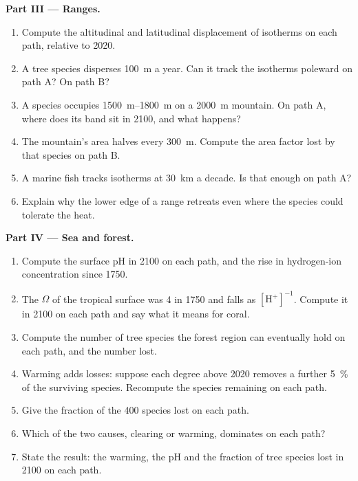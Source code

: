 \begin{problem}
\medskip
\noindent\textbf{Part III --- Ranges.}
\begin{enumerate}[resume]
  \item Compute the altitudinal and latitudinal displacement of
        isotherms on each path, relative to 2020.
  \item A tree species disperses \qty{100}{m} a year. Can it track
        the isotherms poleward on path A? On path B?
  \item A species occupies \qtyrange{1500}{1800}{m} on a
        \qty{2000}{m} mountain. On path A, where does its band sit
        in 2100, and what happens?
  \item The mountain's area halves every \qty{300}{m}. Compute the
        area factor lost by that species on path B.
  \item A marine fish tracks isotherms at \qty{30}{km} a decade.
        Is that enough on path A?
  \item Explain why the lower edge of a range retreats even where
        the species could tolerate the heat.
\end{enumerate}

\medskip
\noindent\textbf{Part IV --- Sea and forest.}
\begin{enumerate}[resume]
  \item Compute the surface pH in 2100 on each path, and the rise
        in hydrogen-ion concentration since 1750.
  \item The  $\Omega$ of the tropical surface was
        4 in 1750 and falls as $[\ensuremath{\mathrm{H^{+}}}]^{-1}$. Compute it in 2100
        on each path and say what it means for coral.
  \item Compute the number of tree species the forest region can
        eventually hold on each path, and the number lost.
  \item Warming adds losses: suppose each degree above 2020 removes
        a further \qty{5}{\%} of the surviving species. Recompute
        the species remaining on each path.
  \item Give the fraction of the 400 species lost on each path.
  \item Which of the two causes, clearing or warming, dominates on
        each path?
  \item State the result: the warming, the pH and the fraction of
        tree species lost in 2100 on each path.
\end{enumerate}
\end{problem}
